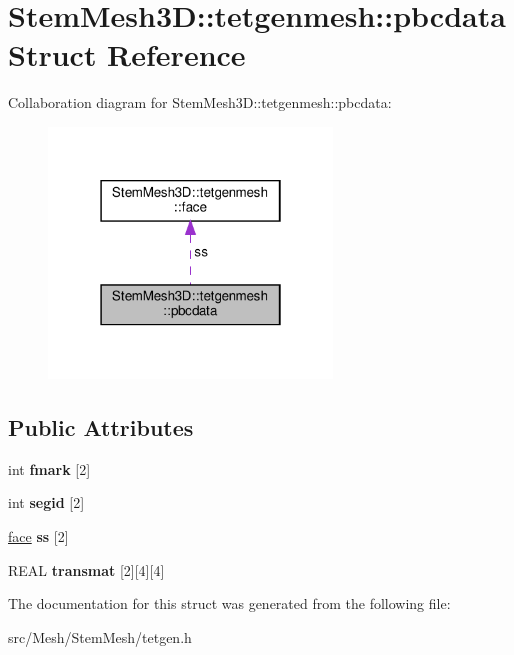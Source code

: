 \hypertarget{structStemMesh3D_1_1tetgenmesh_1_1pbcdata}{}\section{Stem\+Mesh3D\+:\+:tetgenmesh\+:\+:pbcdata Struct Reference}
\label{structStemMesh3D_1_1tetgenmesh_1_1pbcdata}


Collaboration diagram for Stem\+Mesh3D\+:\+:tetgenmesh\+:\+:pbcdata\+:\nopagebreak
\begin{figure}[H]
\begin{center}
\leavevmode
\includegraphics[width=214pt]{structStemMesh3D_1_1tetgenmesh_1_1pbcdata__coll__graph}
\end{center}
\end{figure}
\subsection*{Public Attributes}
\begin{DoxyCompactItemize}
\item 
\mbox{\label{structStemMesh3D_1_1tetgenmesh_1_1pbcdata_a0363f11b33c98abcf3c4878c9d96d36c}} 
int {\bfseries fmark} \mbox{[}2\mbox{]}
\item 
\mbox{\label{structStemMesh3D_1_1tetgenmesh_1_1pbcdata_af4efd5f8da71f48428db0a473be400db}} 
int {\bfseries segid} \mbox{[}2\mbox{]}
\item 
\mbox{\label{structStemMesh3D_1_1tetgenmesh_1_1pbcdata_ae58295e2a54c79937ed906410695dec9}} 
\hyperlink{classStemMesh3D_1_1tetgenmesh_1_1face}{face} {\bfseries ss} \mbox{[}2\mbox{]}
\item 
\mbox{\label{structStemMesh3D_1_1tetgenmesh_1_1pbcdata_a8f4a26ee38db65cbf87da7add136e008}} 
R\+E\+AL {\bfseries transmat} \mbox{[}2\mbox{]}\mbox{[}4\mbox{]}\mbox{[}4\mbox{]}
\end{DoxyCompactItemize}


The documentation for this struct was generated from the following file\+:\begin{DoxyCompactItemize}
\item 
src/\+Mesh/\+Stem\+Mesh/tetgen.\+h\end{DoxyCompactItemize}
